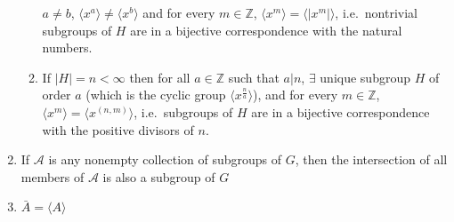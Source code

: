 \documentclass[titlepage, 12pt]{article}
\begin{document}
\begin{enumerate}
\begin{enumerate}
                $a\neq b$, $\langle x^a\rangle\neq\langle x^b\rangle$ and for
                every $m\in\mathbb{Z}$, $\langle x^m\rangle = \langle
                |x^m|\rangle$, i.e.\ nontrivial subgroups of $H$ are in a
                bijective correspondence with the natural numbers.
            \item If $|H| = n < \infty$ then for all $a\in\mathbb{Z}$ such that
                $a|n$, $\exists$ unique subgroup $H$ of order $a$ (which is the
                cyclic group $\langle x^{\frac{n}{a}}\rangle$), and for every
                $m\in\mathbb{Z}$, $\langle x^m\rangle = \langle x^{(n,
                m)}\rangle$, i.e.\ subgroups of $H$ are in a bijective
                correspondence with the positive divisors of $n$.
        \end{enumerate}
    \item If $\mathcal{A}$ is any nonempty collection of subgroups of $G$, then
        the intersection of all members of $\mathcal{A}$ is also a subgroup of
        $G$
    \item $\bar{A} = \langle A\rangle$
\end{enumerate}
\end{document}
